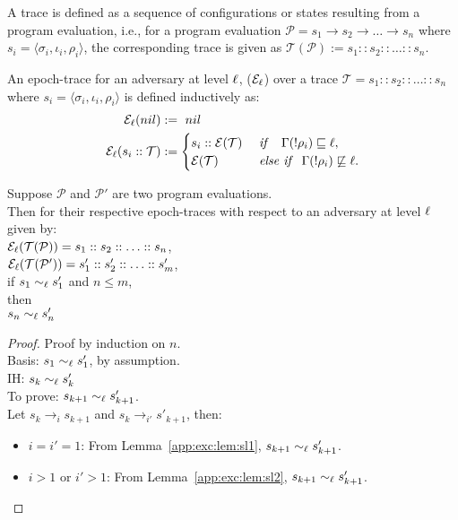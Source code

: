 \begin{mydef}[Trace]
\label{def:trace}
A trace is defined as a sequence of configurations or states resulting from a
program evaluation, i.e., for a program evaluation $\mathcal{P} = s_1 \rightarrow s_2
\rightarrow \ldots \rightarrow s_n$ where $s_i = \langle \sigma_i,
\iota_i, \rho_i\rangle$, the corresponding trace is given 
as $\mathcal{T}(\mathcal{P}) := s_1 :: s_2 :: \ldots :: s_n$.
\end{mydef}

\begin{mydef}
\label{def:etrace}
An epoch-trace for an adversary at level $\ell$, ($\mathcal{E}_\ell$) over a
trace $\mathcal{T} = s_1 :: s_2 :: \ldots :: s_n$ where $s_i = \langle
\sigma_i, \iota_i, \rho_i\rangle$  is defined inductively as:
\begin{align*}
  \mathcal{E}_\ell(nil) &:=~nil \\
  \mathcal{E}_\ell(s_i :: \mathcal{T}) &:=
  \begin{cases}
   s_i :: \mathcal{E}(\mathcal{T})~ & \mathit{if}~~~\Gamma(!\rho_i)
   \sqsubseteq \ell,\\
   \mathcal{E}(\mathcal{T}) & \mathit{else~if} ~~\Gamma(!\rho_i)
   \not\sqsubseteq \ell.
  \end{cases}
\end{align*}
\end{mydef}

\begin{myThm}
\label{app:exc:thm:ni} 
Suppose $\mathcal{P}$ and  $\mathcal{P}'$ are two program
evaluations. \\
Then for their respective epoch-traces with respect to an adversary at
level $\ell$ given by:\\
\hspace{5 mm} $\mathcal{E}_\ell(\mathcal{T}(\mathcal{P})) = s_1 :: s_2 :: \ldots ::
s_n$,\\
\hspace{5 mm} $\mathcal{E}_\ell(\mathcal{T}(\mathcal{P}')) = s_1' :: s_2' :: \ldots ::
s_m'$,\\
if $s_1 \sim_\ell s_1'$ and $n \leq m$,\\
then\\
\hspace{5 mm} $s_n \sim_\ell s_n'$
\end{myThm}
\begin{proof}
Proof by induction on $n$.\\
Basis: $s_1 \sim_\ell s_1'$, by assumption. \\
IH: $s_k \sim_\ell s_k'$ \\
To prove: $s_{k+1}
\sim_\ell s_{k+1}'$. \\
Let $s_k \rightarrow_i s_{k+1}$ and $s_k \rightarrow_{i'} s'_{k+1}$, then:
\begin{itemize}
\item $i = i' = 1$: From Lemma~\ref{app:exc:lem:sl1}, $s_{k+1}
  \sim_\ell s_{k+1}'$.
\item $i > 1$ or $i' > 1$: From Lemma~\ref{app:exc:lem:sl2}, $s_{k+1}
  \sim_\ell s_{k+1}'$.
\end{itemize}
\end{proof}


